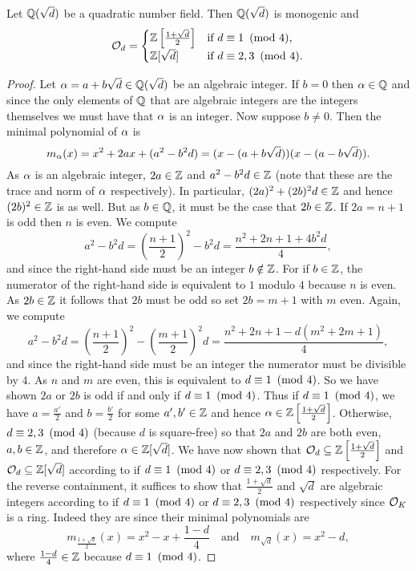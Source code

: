     \begin{proposition}\label{prop:ring_of_integers_quadratic}
      Let $\mathbb{Q}(\sqrt{d})$ be a quadratic number field. Then $\mathbb{Q}(\sqrt{d})$ is monogenic and
      \[
        \mathcal{O}_{d} = \begin{cases} \mathbb{Z}\left[\frac{1+\sqrt{d}}{2}\right] & \text{if $d \equiv 1 \ \left(\text{mod }4\right)$}, \\ \mathbb{Z}[\sqrt{d}] & \text{if $d \equiv 2,3 \ \left(\text{mod }4\right)$}. \end{cases}
      \]
    \end{proposition}
    \begin{proof}
      Let $\alpha = a+b\sqrt{d} \in \mathbb{Q}(\sqrt{d})$ be an algebraic integer. If $b = 0$ then $\alpha \in \mathbb{Q}$ and since the only elements of $\mathbb{Q}$ that are algebraic integers are the integers themselves we must have that $\alpha$ is an integer. Now suppose $b \neq 0$. Then the minimal polynomial of $\alpha$ is
      \[
        m_{\alpha}(x) = x^{2}+2ax+(a^{2}-b^{2}d) = (x-(a+b\sqrt{d}))(x-(a-b\sqrt{d})).
      \]
      As $\alpha$ is an algebraic integer, $2a \in \mathbb{Z}$ and $a^{2}-b^{2}d \in \mathbb{Z}$ (note that these are the trace and norm of $\alpha$ respectively). In particular, $(2a)^{2}+(2b)^{2}d \in \mathbb{Z}$ and hence $(2b)^{2} \in \mathbb{Z}$ is as well. But as $b \in \mathbb{Q}$, it must be the case that $2b \in \mathbb{Z}$. If $2a = n+1$ is odd then $n$ is even. We compute
      \[
        a^{2}-b^{2}d = \left(\frac{n+1}{2}\right)^{2}-b^{2}d = \frac{n^{2}+2n+1+4b^{2}d}{4},
      \]
      and since the right-hand side must be an integer $b \notin \mathbb{Z}$. For if $b \in \mathbb{Z}$, the numerator of the right-hand side is equivalent to $1$ modulo $4$ because $n$ is even. As $2b \in \mathbb{Z}$ it follows that $2b$ must be odd so set $2b = m+1$ with $m$ even. Again, we compute
      \[
        a^{2}-b^{2}d = \left(\frac{n+1}{2}\right)^{2}-\left(\frac{m+1}{2}\right)^{2}d = \frac{n^{2}+2n+1-d(m^{2}+2m+1)}{4},
      \]
      and since the right-hand side must be an integer the numerator must be divisible by $4$. As $n$ and $m$ are even, this is equivalent to $d \equiv 1 \ \left(\text{mod }4\right)$. So we have shown $2a$ or $2b$ is odd if and only if $d \equiv 1 \ \left(\text{mod }4\right)$. Thus if $d \equiv 1 \ \left(\text{mod }4\right)$, we have $a = \frac{a'}{2}$ and $b = \frac{b'}{2}$ for some $a',b' \in \mathbb{Z}$ and hence $\alpha \in \mathbb{Z}\left[\frac{1+\sqrt{d}}{2}\right]$. Otherwise, $d \equiv 2,3 \ \left(\text{mod }4\right)$ (because $d$ is square-free) so that $2a$ and $2b$ are both even, $a,b \in \mathbb{Z}$, and therefore $\alpha \in \mathbb{Z}[\sqrt{d}]$. We have now shown that $\mathcal{O}_{d} \subseteq \mathbb{Z}\left[\frac{1+\sqrt{d}}{2}\right]$ and $\mathcal{O}_{d} \subseteq \mathbb{Z}[\sqrt{d}]$ according to if $d \equiv 1 \ \left(\text{mod }4\right)$ or $d \equiv 2,3 \ \left(\text{mod }4\right)$ respectively. For the reverse containment, it suffices to show that $\frac{1+\sqrt{d}}{2}$ and $\sqrt{d}$ are algebraic integers according to if $d \equiv 1 \ \left(\text{mod }4\right)$ or $d \equiv 2,3 \ \left(\text{mod }4\right)$ respectively since $\mathcal{O}_{K}$ is a ring. Indeed they are since their minimal polynomials are
      \[
        m_{\frac{1+\sqrt{d}}{2}}(x) = x^{2}-x+\frac{1-d}{4} \quad \text{and} \quad m_{\sqrt{d}}(x) = x^{2}-d,
      \]
      where $\frac{1-d}{4} \in \mathbb{Z}$ because $d \equiv 1 \ \left(\text{mod }4\right)$.
    \end{proof}

